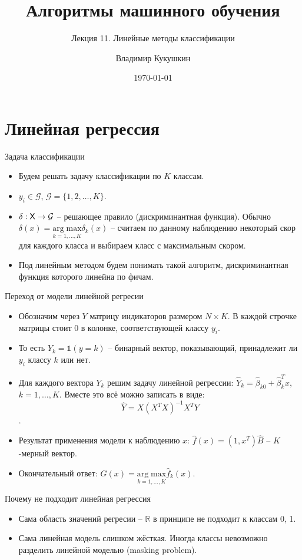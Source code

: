 \documentclass[9pt]{beamer}
\title{Алгоритмы машинного обучения}
\subtitle{Лекция 11. Линейные методы классификации}
\author{Владимир Кукушкин}
\institute{СПбГЭУ - 10.03.2021}
\date{\today}
\begin{document}
\titlepage

\section{Линейная регрессия}

\begin{frame}{Задача классификации}
\begin{itemize}
    \item Будем решать задачу классификации по $K$ классам.
    \item $y_i \in \mathcal{G}$, $\mathcal{G} = \{1, 2, \ldots, K\}$.
    \item $\delta: \sf{X} \rightarrow \mathcal{G}$ -- решающее правило (дискриминантная функция). Обычно $\delta(x) = \underset{k=1,\ldots,K}{\mathrm{arg\;max}}\delta_k(x)$ -- считаем по данному наблюдению некоторый скор для каждого класса и выбираем класс с максимальным скором.
    \item Под линейным методом будем понимать такой алгоритм, дискриминантная функция которого линейна по фичам.
\end{itemize}
    
\end{frame}

\begin{frame}{Переход от модели линейной регресии}
    \begin{itemize}
        \item Обозначим через $Y$ матрицу индикаторов размером $N\times K$. В каждой строчке матрицы стоит 0 в колонке, соответствующей классу $y_i$.
        \item То есть $Y_k = \mathds{1}(y=k)$ -- бинарный вектор, показывающий, принадлежит ли $y_i$ классу $k$ или нет.
        \item Для каждого вектора $Y_k$ решим задачу линейной регрессии: $\hat Y_k = \hat\beta_{k0} +\hat\beta_{k}^Tx$, $k=1,\ldots,K$. Вместе это всё можно записать в виде:
        $$\hat Y = X(X^TX)^{-1}X^TY$$.
        \item Результат применения модели к наблюдению $x$: $\hat f(x) = (1, x^T)\hat B$ -- $K$-мерный вектор.
        \item Окончательный ответ: $\hat G(x) = \underset{k=1,\ldots,K}{\mathrm{arg\;max}}\hat f_k(x)$.
        \end{itemize}
\end{frame}

\begin{frame}{Почему не подходит линейная регрессия}

\begin{itemize}
    \item Сама область значений регресии -- $\mathbb{R}$ в принципе не подходит к классам 0, 1.
    \item Сама линейная модель слишком жёсткая. Иногда классы невозможно разделить линейной моделью (masking problem).
\end{itemize}    
\end{frame}
\end{document}
